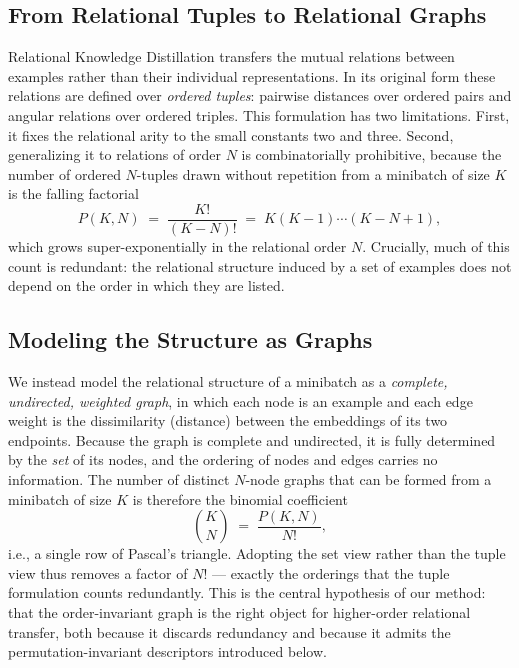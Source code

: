 \documentclass[11pt,letterpaper]{article}
\begin{document}
\subsection{From Relational Tuples to Relational Graphs}
\label{sec:tuples-to-graphs}

Relational Knowledge Distillation transfers the mutual relations between examples
rather than their individual representations. In its original form these relations
are defined over \emph{ordered tuples}: pairwise distances over ordered pairs and
angular relations over ordered triples. This formulation has two limitations. First,
it fixes the relational arity to the small constants two and three. Second,
generalizing it to relations of order $N$ is combinatorially prohibitive, because the
number of ordered $N$-tuples drawn without repetition from a minibatch of size $K$ is
the falling factorial
\begin{equation}
    P(K, N) \;=\; \frac{K!}{(K-N)!} \;=\; K (K-1)\cdots(K-N+1),
    \label{eq:falling_factorial}
\end{equation}
which grows super-exponentially in the relational order $N$. Crucially, much of this
count is redundant: the relational structure induced by a set of examples does not
depend on the order in which they are listed.

\subsection{Modeling the Structure as Graphs}
\label{sec:graph-model}

We instead model the relational structure of a minibatch as a \emph{complete,
undirected, weighted graph}, in which each node is an example and each edge weight is
the dissimilarity (distance) between the embeddings of its two endpoints. Because the
graph is complete and undirected, it is fully determined by the \emph{set} of its
nodes, and the ordering of nodes and edges carries no information. The number of
distinct $N$-node graphs that can be formed from a minibatch of size $K$ is therefore
the binomial coefficient
\begin{equation}
    \binom{K}{N} \;=\; \frac{P(K,N)}{N!},
    \label{eq:binomial}
\end{equation}
i.e., a single row of Pascal's triangle. Adopting the set view rather than the tuple
view thus removes a factor of $N!$ --- exactly the orderings that the tuple
formulation counts redundantly. This is the central hypothesis of our method: that
the order-invariant graph is the right object for higher-order relational transfer,
both because it discards redundancy and because it admits the permutation-invariant
descriptors introduced below.
\end{document}
